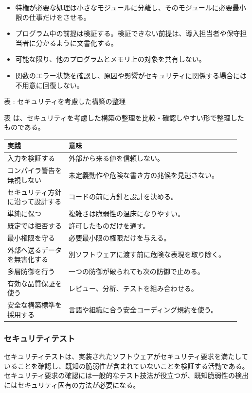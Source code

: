 \begin{itemize}[leftmargin=2em]
\item 特権が必要な処理は小さなモジュールに分離し、そのモジュールに必要最小限の仕事だけをさせる。
\item プログラム中の前提は検証する。検証できない前提は、導入担当者や保守担当者に分かるように文書化する。
\item 可能な限り、他のプログラムとメモリ上の対象を共有しない。
\item 関数のエラー状態を確認し、原因や影響がセキュリティに関係する場合には不用意に回復しない。
\end{itemize}
\par\smallskip\noindent{}\label{tab:ch13-03}表 \thetable: セキュリティを考慮した構築の整理\par\smallskip
表 \thetable は、セキュリティを考慮した構築の整理を比較・確認しやすい形で整理したものである。\par\smallskip
\begin{longtable}{>{\raggedright\arraybackslash}p{0.25\linewidth}>{\raggedright\arraybackslash}p{0.7\linewidth}}
\toprule
実践 & 意味 \\
\midrule
\endhead
入力を検証する & 外部から来る値を信頼しない。 \\
コンパイラ警告を無視しない & 未定義動作や危険な書き方の兆候を見逃さない。 \\
セキュリティ方針に沿って設計する & コードの前に方針と設計を決める。 \\
単純に保つ & 複雑さは脆弱性の温床になりやすい。 \\
既定では拒否する & 許可したものだけを通す。 \\
最小権限を守る & 必要最小限の権限だけを与える。 \\
外部へ送るデータを無害化する & 別ソフトウェアに渡す前に危険な表現を取り除く。 \\
多層防御を行う & 一つの防御が破られても次の防御で止める。 \\
有効な品質保証を使う & レビュー、分析、テストを組み合わせる。 \\
安全な構築標準を採用する & 言語や組織に合う安全コーディング規約を使う。 \\
\bottomrule
\end{longtable}
\subsubsection{セキュリティテスト}
セキュリティテストは、実装されたソフトウェアがセキュリティ要求を満たしていることを確認し、既知の脆弱性が含まれていないことを検証する活動である。セキュリティ要求の確認には一般的なテスト技法が役立つが、既知脆弱性の検出にはセキュリティ固有の方法が必要になる。

